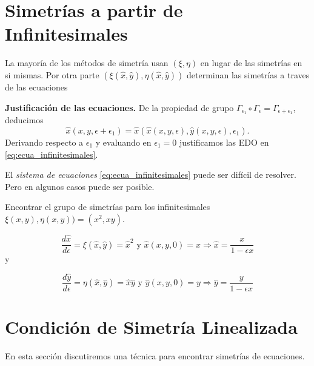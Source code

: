\section{Simetrías a partir de Infinitesimales }

 La mayoría de los métodos de simetría usan  $(\xi,\eta)$ en lugar de las simetrías en si mismas.
Por otra parte  $(\xi(\hat{x},\hat{y}),\eta(\hat{x},\hat{y}))$ determinan las simetrías a traves de las ecuaciones

\textbf{Justificación de las ecuaciones.}
De la propiedad de grupo $ \Gamma_{\epsilon_1} \circ  \Gamma_{\epsilon}=
\Gamma_{\epsilon+\epsilon_1}$, deducimos 
\[\hat{x}(x,y,\epsilon+\epsilon_1)=\hat{x}(\hat{x}(x,y,\epsilon),
\hat{y}(x,y,\epsilon),\epsilon_1).\]
Derivando respecto a $\epsilon_1$ y evaluando en $\epsilon_1=0$ justificamos las EDO en 
\eqref{eq:ecua_infinitesimales}.




















El \emph{sistema de ecuaciones} \eqref{eq:ecua_infinitesimales}    puede ser difícil de resolver. Pero en algunos casos puede ser posible.

 \begin{ejemplo} Encontrar el grupo de simetrías para los infinitesimales $\xi(x,y),\eta(x,y))=(x^2,xy)$.
   \end{ejemplo}



\[ \frac{d\hat{x}}{d\epsilon}=\xi(\hat{x},\hat{y})=\hat{x}^2\text{ y }\hat{x}(x,y,0)=x
\Rightarrow \hat{x}=\frac{x}{1-\epsilon x}\]
y

\[ \frac{d\hat{y}}{d\epsilon}=\eta(\hat{x},\hat{y})=\hat{x}\hat{y}\text{ y }\hat{y}(x,y,0)=y
\Rightarrow \hat{y}=\frac{y}{1-\epsilon x}\]

\section{Condición de Simetría Linealizada}
En esta sección discutiremos una técnica para encontrar simetrías de ecuaciones. 


